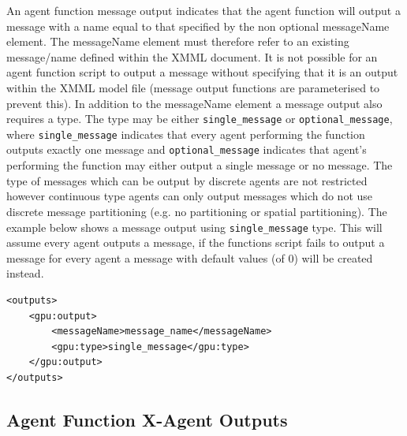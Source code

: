 \documentclass[11pt, a4paper, onecolumn, oneside]{report}
\begin{document}
An agent function message output indicates that the agent function will output a message with a name equal to that specified by the non optional messageName element.
The messageName element must therefore refer to an existing message/name defined within the XMML document.
It is not possible for an agent function script to output a message without specifying that it is an output within the XMML model file (message output functions are parameterised to prevent this).
In addition to the messageName element a message output also requires a type.
The type may be either \texttt{single_message} or \texttt{optional_message}, where \texttt{single_message} indicates that every agent performing the function outputs exactly one message and \texttt{optional_message} indicates that agent's performing the function may either output a single message or no message.
The type of messages which can be output by discrete agents are not restricted however continuous type agents can only output messages which do not use discrete message partitioning (e.g.
no partitioning or spatial partitioning).
The example below shows a message output using \texttt{single_message} type.
This will assume every agent outputs a message, if the functions script fails to output a message for every agent a message with default values (of $0$) will be created instead.

\begin{verbatim}
<outputs>
    <gpu:output>
        <messageName>message_name</messageName>
        <gpu:type>single_message</gpu:type>
    </gpu:output>
</outputs>
\end{verbatim}

\subsection{Agent Function X-Agent Outputs}
\label{sec:253}
\end{document}
